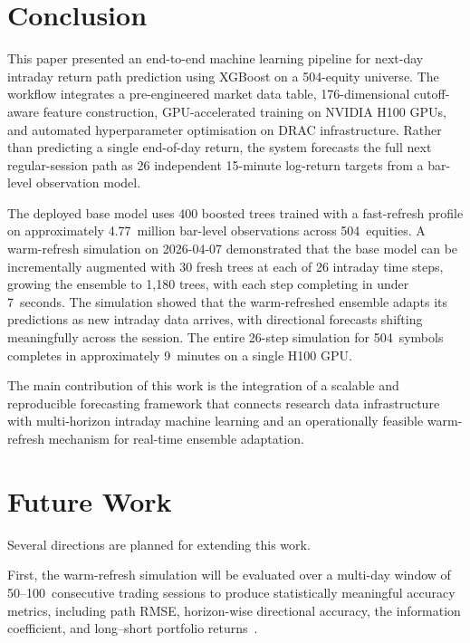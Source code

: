 \documentclass[conference]{IEEEtran}
\begin{document}
\section{Conclusion}\label{sec:conclusion}

This paper presented an end-to-end machine learning pipeline for next-day intraday return path prediction using XGBoost on a 504-equity universe. The workflow integrates a pre-engineered market data table, 176-dimensional cutoff-aware feature construction, GPU-accelerated training on NVIDIA H100 GPUs, and automated hyperparameter optimisation on DRAC infrastructure. Rather than predicting a single end-of-day return, the system forecasts the full next regular-session path as 26 independent 15-minute log-return targets from a bar-level observation model.

The deployed base model uses 400 boosted trees trained with a fast-refresh profile on approximately 4.77~million bar-level observations across 504~equities. A warm-refresh simulation on 2026-04-07 demonstrated that the base model can be incrementally augmented with 30 fresh trees at each of 26 intraday time steps, growing the ensemble to 1{,}180 trees, with each step completing in under 7~seconds. The simulation showed that the warm-refreshed ensemble adapts its predictions as new intraday data arrives, with directional forecasts shifting meaningfully across the session. The entire 26-step simulation for 504~symbols completes in approximately 9~minutes on a single H100 GPU.

The main contribution of this work is the integration of a scalable and reproducible forecasting framework that connects research data infrastructure with multi-horizon intraday machine learning and an operationally feasible warm-refresh mechanism for real-time ensemble adaptation.

\section{Future Work}\label{sec:futurework}

Several directions are planned for extending this work.

First, the warm-refresh simulation will be evaluated over a multi-day window of 50--100~consecutive trading sessions to produce statistically meaningful accuracy metrics, including path RMSE, horizon-wise directional accuracy, the information coefficient, and long--short portfolio returns~\cite{lopezdeprado2018afml}.
\end{document}
